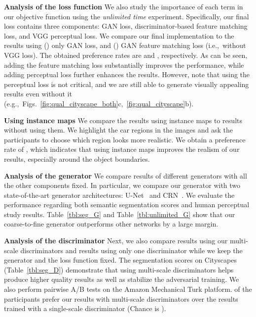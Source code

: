 \documentclass[10pt,twocolumn,letterpaper]{article}
\newcommand{\reftbl}[1]{Table~\ref{tbl:#1}}
\begin{document}
\vspace{.03in}
{\noindent \bf Analysis of the loss function} We also study the importance of each term in our objective function using the \textit{unlimited time}  experiment.
Specifically, our final loss contains three components: GAN loss, discriminator-based feature matching loss, and VGG perceptual loss. We compare our final implementation to the results using () only GAN loss, and () GAN  feature matching loss (i.e.,\ without VGG loss). The obtained preference rates are  and , respectively.
As can be seen, adding the feature matching loss substantially improves the performance, while adding perceptual loss further enhances the results. However, note that using the perceptual loss is not critical, and we are still able to generate visually appealing results even without it (e.g.,\ Figs.~\ref{fig:qual_cityscape_both}c,~\ref{fig:qual_cityscape}b). 

\vspace{.03in}
{\noindent \bf Using instance maps} We compare the results using instance maps to results without using them. We highlight the car regions in the images and ask the participants to choose which region looks more realistic. We obtain a preference rate of , which indicates that using instance maps improves the realism of our results, especially around the object boundaries.

\vspace{.03in}
{\noindent \bf Analysis of the generator } 
We compare results of different generators with all the other components fixed. In particular, we compare our generator with two state-of-the-art generator architectures: U-Net~\cite{ronneberger2015u,isola2016image} and CRN~\cite{chen2017photographic}. We evaluate the performance regarding both semantic segmentation scores and human perceptual study results. \reftbl{seg_G} and \reftbl{unlimited_G} show that our coarse-to-fine generator outperforms other networks by a large margin.

\vspace{.03in}
{\noindent \bf Analysis of the discriminator } 
Next, we also compare results using our multi-scale discriminators and results using only one discriminator while we keep the generator and the loss function fixed. The segmentation scores on Cityscapes~\cite{Cordts2016cityscapes} (\reftbl{seg_D}) demonstrate that using multi-scale discriminators helps produce higher quality results as well as stabilize the adversarial training. We also perform pairwise A/B tests on the Amazon Mechanical Turk platform.  of the participants prefer our results with multi-scale discriminators over the results trained with a single-scale discriminator (Chance is ).
\end{document}
